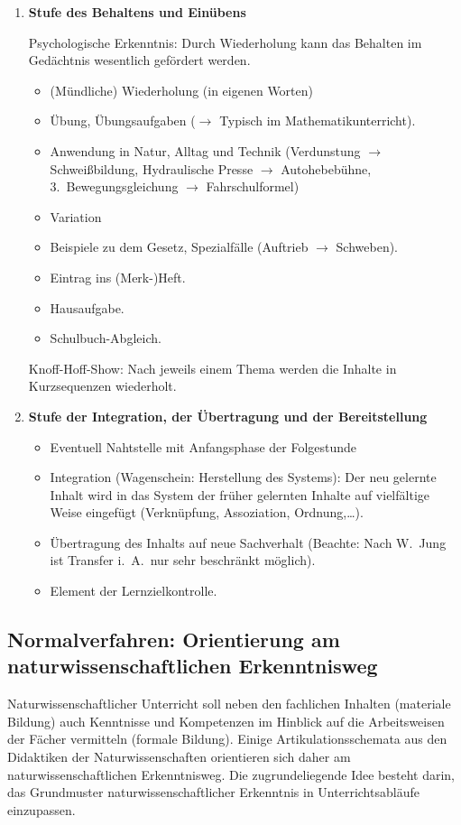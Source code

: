 \begin{enumerate}
	\item {\bf Stufe des Behaltens und Ein\"{u}bens}
	
	Psychologische Erkenntnis:
	Durch Wiederholung kann das Behalten im
	Ged\"{a}chtnis wesentlich gef\"{o}rdert werden.
	
	\begin{itemize}
		\item (M\"{u}ndliche) Wiederholung (in eigenen Worten)
		\item \"{U}bung, \"{U}bungsaufgaben
		($\to$ Typisch im Mathematikunterricht).
		\item Anwendung in Natur, Alltag und Technik (Verdunstung $\to$
		Schwei{\ss}bildung, Hydraulische Presse $\to$ Autohebeb\"{u}hne,
		3.\ Bewegungsgleichung $\to$ Fahrschulformel)
		\item Variation
		\item Beispiele zu dem Gesetz,
		Spezialf\"{a}lle (Auftrieb $\to$ Schweben).
		\item Eintrag ins (Merk-)Heft.
		\item Hausaufgabe.
		\item Schulbuch-Abgleich.
	\end{itemize}
	
	\begin{beisp}
		Knoff-Hoff-Show:
	Nach jeweils einem Thema werden die Inhalte in
	Kurzsequenzen wiederholt.
	\end{beisp}
	
	\item {\bf Stufe der Integration, der \"{U}bertragung und
	der Bereitstellung}
	
	\begin{itemize}
		\item Eventuell Nahtstelle mit Anfangsphase der Folgestunde
		\item Integration (Wagenschein: Herstellung des Systems):
		Der neu gelernte Inhalt wird in das System der fr\"{u}her
		gelernten Inhalte auf vielf\"{a}ltige Weise
		eingef\"{u}gt (Verkn\"{u}pfung, Assoziation, Ordnung,\dots).
		\item \"{U}bertragung des Inhalts auf neue Sachverhalt
		(Beachte: Nach W.\ Jung ist Transfer i.~A.\ nur sehr
		beschr\"{a}nkt m\"{o}glich).
		\item Element der Lernzielkontrolle.
	\end{itemize}
\end{enumerate}

\subsection{Normalverfahren: Orientierung am naturwissenschaftlichen Erkenntnisweg}
Naturwissenschaftlicher Unterricht soll neben den fachlichen Inhalten (materiale Bildung) auch Kenntnisse und Kompetenzen im Hinblick auf die Arbeitsweisen der Fächer vermitteln (formale Bildung). Einige Artikulationsschemata aus den Didaktiken der Naturwissenschaften orientieren sich daher am naturwissenschaftlichen Erkenntnisweg. Die zugrundeliegende Idee besteht darin, das Grundmuster naturwissenschaftlicher Erkenntnis in Unterrichtsabl\"{a}ufe einzupassen. 

